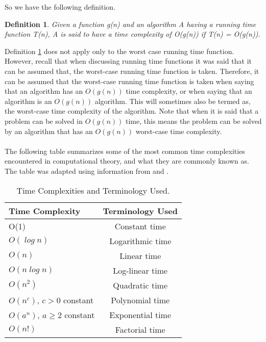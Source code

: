 \documentclass{article}
\newtheorem{definition}{Definition}[subsection]
\begin{document}
So we have the following definition.
\begin{definition}
\label{time_complexity}
Given a function g(n) and an algorithm A having a running time function T(n), A is said to have a time complexity of O(g(n)) if T(n) = O(g(n)).  
\end{definition}
Definition \ref{time_complexity} does not apply only to the worst case running time function. However, recall that when discussing running time functions it was said that it can be assumed that, the worst-case running time function is taken. Therefore, it can be assumed that the worst-case running time function is taken when saying that an algorithm has an $\mathit{O(g(n))}$ time complexity, or when saying that an algorithm is an $\mathit{O(g(n))}$ algorithm. This will sometimes also be termed as, the worst-case time complexity of the algorithm. Note that when it is said that a problem can be solved in $\mathit{O(g(n))}$ time, this means the problem can be solved by an algorithm that has an $\mathit{O(g(n))}$ worst-case time complexity.\\\\
The following table summarizes some of the most common time complexities encountered in computational theory, and what they are commonly known as. The table was adapted using information from \cite{big_o_notation_explained} and \cite{carter_1999}.
\begin{table}[!htbp]
  \begin{center}
    \caption{Time Complexities and Terminology Used.}
    \label{tab:table1}
    \begin{tabular}{l|c} %
      \textbf{Time Complexity} & \textbf{Terminology Used}\\
      \hline
      O(1)                          & Constant time    \\
     $O(\mathit{\log n})$          & Logarithmic time \\
     $O(\mathit{n})$               & Linear time      \\
     $O(\mathit{n \log n})$        & Log-linear time  \\
     $O(\mathit{n^2})$             & Quadratic time   \\
     $O(\mathit{n^c})$, $\mathit{c > 0}$ constant & Polynomial time  \\
     $O(\mathit{a^n})$, $\mathit{a \geq 2}$ constant & Exponential time \\
     $O(\mathit{n!})$              & Factorial time
    \end{tabular}
  \end{center}
\end{table}
\end{document}

